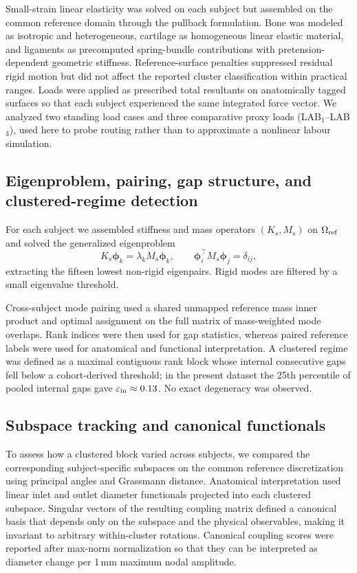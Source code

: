 \documentclass[11pt]{article}
\newcommand{\LABone}{LAB$_1$}
\newcommand{\LABthree}{LAB$_3$}
\begin{document}
Small-strain linear elasticity was solved on each subject but assembled on the common reference domain through the pullback formulation.
Bone was modeled as isotropic and heterogeneous, cartilage as homogeneous linear elastic material, and ligaments as precomputed spring-bundle contributions with pretension-dependent geometric stiffness.
Reference-surface penalties suppressed residual rigid motion but did not affect the reported cluster classification within practical ranges.
Loads were applied as prescribed total resultants on anatomically tagged surfaces so that each subject experienced the same integrated force vector.
We analyzed two standing load cases and three comparative proxy loads (\LABone--\LABthree), used here to probe routing rather than to approximate a nonlinear labour simulation.

\subsection{Eigenproblem, pairing, gap structure, and clustered-regime detection}

For each subject we assembled stiffness and mass operators $(K_s,M_s)$ on $\Omega_{\rm ref}$ and solved the generalized eigenproblem
\begin{equation}
K_s\boldsymbol\phi_k = \lambda_k M_s\boldsymbol\phi_k,
\qquad
\boldsymbol\phi_i^\top M_s \boldsymbol\phi_j = \delta_{ij},
\end{equation}
extracting the fifteen lowest non-rigid eigenpairs.
Rigid modes are filtered by a small eigenvalue threshold.

Cross-subject mode pairing used a shared unmapped reference mass inner product and optimal assignment on the full matrix of mass-weighted mode overlaps.
Rank indices were then used for gap statistics, whereas paired reference labels were used for anatomical and functional interpretation.
A clustered regime was defined as a maximal contiguous rank block whose internal consecutive gaps fell below a cohort-derived threshold; in the present dataset the 25th percentile of pooled internal gaps gave $\varepsilon_{\rm in}\approx 0.13$.
No exact degeneracy was observed.

\subsection{Subspace tracking and canonical functionals}

To assess how a clustered block varied across subjects, we compared the corresponding subject-specific subspaces on the common reference discretization using principal angles and Grassmann distance.
Anatomical interpretation used linear inlet and outlet diameter functionals projected into each clustered subspace.
Singular vectors of the resulting coupling matrix defined a canonical basis that depends only on the subspace and the physical observables, making it invariant to arbitrary within-cluster rotations.
Canonical coupling scores were reported after max-norm normalization so that they can be interpreted as diameter change per 1\,mm maximum nodal amplitude.
\end{document}
